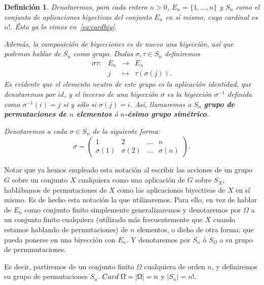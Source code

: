 \documentclass[12pt]{article}
\newtheorem{definition}[theorem]{Definición}
\begin{document}
\begin{definition} Denotaremos, para cada entero $n>0$, $E_{n} = \lbrace 1, \ldots , n\rbrace$ y $S_{n}$ como el conjunto de aplicaciones biyectivas del conjunto $E_{n}$ en sí mismo, cuyo cardinal es $n!$. Ésto ya lo vimos en~\ref{eq:cardbiy}. 

Además, la composición de biyecciones es de nuevo una biyección, así que podemos hablar de $S_{n}$ como grupo. Dadas $\sigma, \tau \in S_{n}$ definiremos $$\begin{array}{rccl}
\sigma \tau\colon &E_{n}& \longrightarrow &E_{n}\\
&j& \longmapsto &\tau (\sigma (j)).
\end{array}
$$
Es evidente que el elemento neutro de este grupo es la aplicación identidad, que denotaremos por $id$, y el inverso de una biyección $\sigma$ es la biyección $\sigma^{-1}$ definida como $\sigma^{-1}(i) = j$ si y sólo si $\sigma(j) = i$. Así, llamaremos a $S_{n}$ \textbf{grupo de permutaciones de $n$ elementos} ó \textbf{$n$-ésimo grupo simétrico}.

Denotaremos a cada $\sigma \in S_{n}$ de la siguiente forma:
$$\sigma = \left(
\begin{matrix}
1 & 2 & \ldots & n \\
\sigma(1) & \sigma(2) & \ldots & \sigma(n)
\end{matrix}
\right).
$$
\end{definition}

Notar que ya hemos empleado esta notación al escribir las acciones de un grupo $G$ sobre un conjunto $X$ cualquiera como una aplicación de $G$ sobre $S_X$, hablábamos de permutaciones de $X$ como las aplicaciones biyectivas de $X$ en sí mismo. Es de hecho esta notación la que utilizaremos. Para ello, en vez de hablar de $E_{n}$ como conjunto finito simplemente generalizaremos y denotaremos por $\Omega$ a un conjunto finito cualquiera (utilizado más frecuentemente que $X$ cuando estamos hablando de permutaciones) de $n$ elementos, o dicho de otra forma: que pueda ponerse en una biyección con $E_{n}$. Y denotaremos por $S_{n}$ ó $S_{\Omega}$ a su grupo de permmutaciones.

Es decir, partiremos de un conjunto finito $\Omega$ cualquiera de orden $n$, y definiremos su grupo de permutaciones $S_{n}$. $Card \hspace{0.1cm} \Omega = |\Omega | = n$ y $|S_{n}| = n!$.
\end{document}
